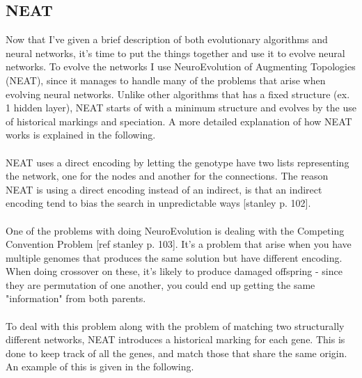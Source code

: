 \documentclass[11pt, a4paper]{article}
\begin{document}
\subsection{NEAT}
Now that I've given a brief description of both evolutionary algorithms and neural networks, it's time to put the things together and use it to evolve neural networks. To evolve the networks I use NeuroEvolution of Augmenting Topologies (NEAT), since it manages to handle many of the problems that arise when evolving neural networks. Unlike other algorithms that has a fixed structure (ex. 1 hidden layer), NEAT starts of with a minimum structure and evolves by the use of historical markings and speciation. A more detailed explanation of how NEAT works is explained in the following.
\\
\\
NEAT uses a direct encoding by letting the genotype have two lists representing the network, one for the nodes and another for the connections. The reason NEAT is using a direct encoding instead of an indirect, is that an indirect encoding tend to bias the search in unpredictable ways [stanley p. 102].
\\
\\
One of the problems with doing NeuroEvolution is dealing with the Competing Convention Problem [ref stanley p. 103]. It's a problem that arise when you have multiple genomes that produces the same solution but have different encoding. When doing crossover on these, it's likely to produce damaged offspring - since they are permutation of one another, you could end up getting the same "information" from both parents.
\\
\\
To deal with this problem along with the problem of matching two structurally different networks, NEAT introduces a historical marking for each gene. This is done to keep track of all the genes, and match those that share the same origin. An example of this is given in the following.
\end{document}
